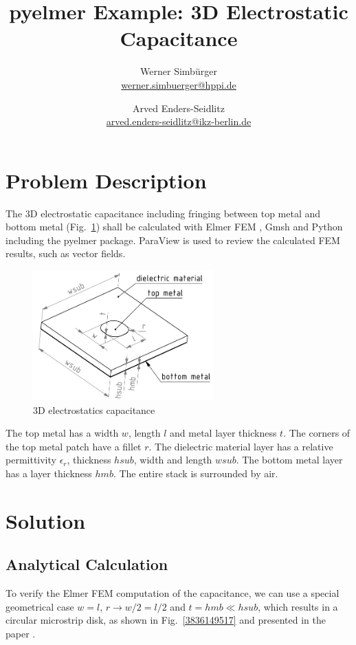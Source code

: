 \documentclass[10pt,a4paper,titlepage]{article}
\author{
Werner Simbürger\\ \href{mailto:werner.simbuerger@hppi.de}{werner.simbuerger@hppi.de}
\and
Arved Enders-Seidlitz \\ \href{mailto:arved.enders-seidlitz@ikz-berlin.de}{arved.enders-seidlitz@ikz-berlin.de}}
\title{pyelmer Example: 3D Electrostatic Capacitance}
\newcommand{\fig}[1]{Fig.~\ref{#1}}
\begin{document}
	\maketitle
	\tableofcontents
\clearpage
\section{Problem Description}

The 3D electrostatic capacitance including fringing between top metal and bottom metal (\fig{3835848427}) shall be calculated with Elmer FEM \cite{ElmerFEM}, Gmsh \cite{Gmsh} and Python \cite{WinPython} including the pyelmer \cite{pyelmer} package. ParaView \cite{ParaView} is used to review the calculated FEM results, such as vector fields.


\begin{figure}[H]
  \begin{center}
     \includegraphics[width=!, height=5cm, angle=0]{./fig/example_01.pdf}
     \caption{3D electrostatics capacitance}
     \label{3835848427}
  \end{center}
\end{figure}

\noindent
The top metal has a width $w$, length $l$ and metal layer thickness $t$. The corners of the top metal patch have a fillet $r$.
The dielectric material layer has a relative permittivity $\epsilon_r$, thickness $hsub$, width and length $wsub$.
The bottom metal layer has a layer thickness $hmb$. The entire stack is surrounded by air.

\section{Solution}

\subsection{Analytical Calculation}

To verify the Elmer FEM computation of the capacitance, we can use a special geometrical case $w = l$, $r \rightarrow w/2 = l/2$ and $t=hmb \ll hsub$, which results in a circular microstrip disk, as shown in \fig{3836149517} and presented in the paper \cite{1130017}.
\end{document}
